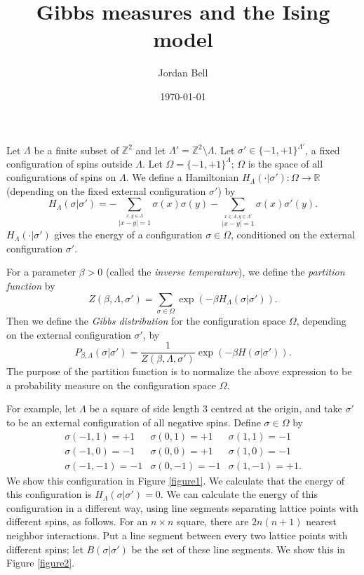 \documentclass{article}
\begin{document}
\title{Gibbs measures and the Ising model}
\author{Jordan Bell}
\date{\today}
\maketitle

Let $\Lambda$ be a finite subset of $\mathbb{Z}^2$ and let $\Lambda'=\mathbb{Z}^2 \setminus \Lambda$. Let $\sigma' \in \{-1,+1\}^{\Lambda'}$, a fixed configuration of spins
outside $\Lambda$. Let $\Omega=\{-1,+1\}^\Lambda$; $\Omega$ is the space of all configurations of spins on $\Lambda$. We define a Hamiltonian $H_\Lambda(\cdot| \sigma') : \Omega \to \mathbb{R}$ (depending on the fixed external configuration $\sigma'$) by
\[
H_\Lambda(\sigma | \sigma')=-\sum_{\stackrel{x,y \in \Lambda}{|x-y|=1}} \sigma(x)\sigma(y)-\sum_{\stackrel{x \in \Lambda, y \in \Lambda'}{|x-y|=1}} \sigma(x) \sigma'(y).
\]
$H_\Lambda(\cdot | \sigma')$ gives the energy of a configuration $\sigma \in \Omega$, conditioned on the external configuration $\sigma'$.

For a parameter $\beta>0$ (called the {\em inverse temperature}), we define the {\em partition function} by
\[
Z(\beta,\Lambda,\sigma')=\sum_{\sigma \in \Omega} \exp(-\beta H_\Lambda(\sigma|\sigma')).
\]
Then we define the {\em Gibbs distribution} for the configuration space $\Omega$, depending on the external configuration $\sigma'$, by
\[
P_{\beta,\Lambda}(\sigma|\sigma')=\frac{1}{Z(\beta,\Lambda,\sigma')} \exp(-\beta H(\sigma|\sigma')).
\]
The purpose of the partition function is to normalize the above expression to be a probability measure on the configuration space $\Omega$.

For example, let $\Lambda$ be a square of side length $3$ centred at the origin, and take $\sigma'$ to be an external configuration of all negative spins. Define $\sigma \in \Omega$ by
\[
\begin{array}{lll}
\sigma(-1,1)=+1& \sigma(0,1)=+1 & \sigma(1,1)=-1\\
\sigma(-1,0)=-1 & \sigma(0,0)=+1 & \sigma(1,0)=-1\\
\sigma(-1,-1)=-1 & \sigma(0,-1)=-1 & \sigma(1,-1)=+1.
\end{array}
\]
We show this configuration in Figure \ref{figure1}. We calculate that the energy of this configuration is $H_\Lambda(\sigma|\sigma')=0$. We can calculate the energy of this configuration in a different way, using line segments separating lattice points with different spins, as follows. For an $n \times n$ square, there are $2n(n+1)$ nearest neighbor interactions. Put a line segment between every two 
lattice points with different spins; let $B(\sigma|\sigma')$ be the set of these line segments. We show this in Figure \ref{figure2}.
\end{document}
